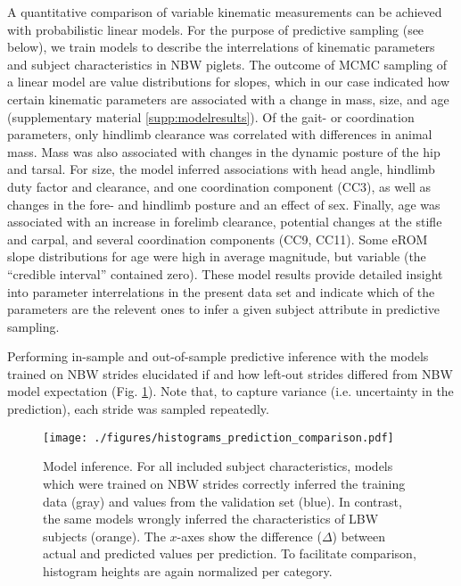 \documentclass[10pt,a4paper]{article}
\begin{document}
\bigskip

A quantitative comparison of variable kinematic measurements can be achieved with probabilistic linear models.
For the purpose of predictive sampling (see below), we train models to describe the interrelations of kinematic parameters and subject characteristics in NBW piglets.
The outcome of MCMC sampling of a linear model are value distributions for slopes, which in our case indicated how certain kinematic parameters are associated with a change in mass, size, and age (supplementary material \ref{supp:modelresults}).
Of the gait- or coordination parameters, only hindlimb clearance was correlated with differences in animal mass.
Mass was also associated with changes in the dynamic posture of the hip and tarsal.
For size, the model inferred associations with head angle, hindlimb duty factor and clearance, and one coordination component (CC3), as well as changes in the fore- and hindlimb posture and an effect of sex.
Finally, age was associated with an increase in forelimb clearance, potential changes at the stifle and carpal, and several coordination components (CC9, CC11).
Some eROM slope distributions for age were high in average magnitude, but variable (the ``credible interval'' contained zero).
These model results provide detailed insight into parameter interrelations in the present data set and indicate which of the parameters are the relevent ones to infer a given subject attribute in predictive sampling.



\bigskip

Performing in-sample and out-of-sample predictive inference with the models trained on NBW strides elucidated if and how left-out strides differed from NBW model expectation (Fig. \ref{fig:predictions}).
Note that, to capture variance (i.e. uncertainty in the prediction), each stride was sampled repeatedly.

\begin{figure}[t!]
\centering
\texttt{[image: ./figures/histograms\_prediction\_comparison.pdf]}
\caption{\label{fig:predictions}Model inference. For all included subject characteristics, models which were trained on NBW strides correctly inferred the training data (gray) and values from the validation set (blue). In contrast, the same models wrongly inferred the characteristics of LBW subjects (orange). The \(x\)-axes show the difference (\(\Delta\)) between actual and predicted values per prediction. To facilitate comparison, histogram heights are again normalized per category.}
\end{figure}
\end{document}
